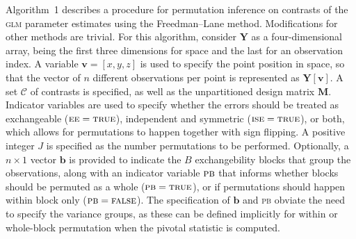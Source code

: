 Algorithm~1 describes a procedure for permutation inference on contrasts of the \textsc{glm} parameter estimates using the Freedman--Lane method. Modifications for other methods are trivial. For this algorithm, consider $\mathbf{Y}$ as a four-dimensional array, being the first three dimensions for space and the last for an observation index. A variable $\mathbf{v}=[x, y, z]$ is used to specify the point position in space, so that the vector of $n$ different observations per point is represented as $\mathbf{Y}[\mathbf{v}]$. A set $\mathcal{C}$ of contrasts is specified, as well as the unpartitioned design matrix $\mathbf{M}$. Indicator variables are used to specify whether the errors should be treated as exchangeable ($\textsc{ee}=\textsc{true}$), independent and symmetric ($\textsc{ise}=\textsc{true}$), or both, which allows for permutations to happen together with sign flipping. A positive integer $J$ is specified as the number permutations to be performed. Optionally, a $n \times 1$ vector $\mathbf{b}$ is provided to indicate the $B$ exchangebility blocks that group the observations, along with an indicator variable $\textsc{pb}$ that informs whether blocks should be permuted as a whole ($\textsc{pb} = \textsc{true}$), or if permutations should happen within block only ($\textsc{pb} = \textsc{false}$). The specification of $\mathbf{b}$ and \textsc{pb} obviate the need to specify the variance groups, as these can be defined implicitly for within or whole-block permutation when the pivotal statistic is computed.

